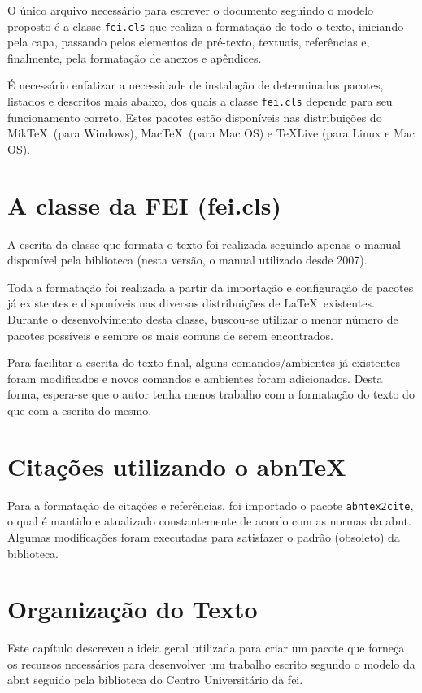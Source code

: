 \documentclass{fei}
\begin{document}
O único arquivo necessário para escrever o documento seguindo o modelo proposto é a classe \texttt{fei.cls} que realiza a formatação de todo o texto, iniciando pela capa, passando pelos elementos de pré-texto, textuais, referências e, finalmente, pela formatação de anexos e apêndices.

É necessário enfatizar a necessidade de instalação de determinados pacotes, listados e descritos mais abaixo, dos quais a classe \texttt{fei.cls} depende para seu funcionamento correto. Estes pacotes estão disponíveis nas distribuições do Mik\TeX~(para Windows), Mac\TeX~(para Mac OS) e \TeX Live (para Linux e Mac OS).

\section{A classe da FEI (fei.cls)}

A escrita da classe que formata o texto foi realizada seguindo apenas o manual disponível pela biblioteca (nesta versão, o manual utilizado desde 2007).

Toda a formatação foi realizada a partir da importação e configuração de pacotes já existentes e disponíveis nas diversas distribuições de \LaTeX~existentes. Durante o desenvolvimento desta classe, buscou-se utilizar o menor número de pacotes possíveis e sempre os mais comuns de serem encontrados.

Para facilitar a escrita do texto final, alguns comandos/ambientes já existentes foram modificados e novos comandos e ambientes foram adicionados. Desta forma, espera-se que o autor tenha menos trabalho com a formatação do texto do que com a escrita do mesmo.

\section{Citações utilizando o abn\TeX}

Para a formatação de citações e referências, foi importado o pacote \texttt{abntex2cite}, o qual é mantido e atualizado constantemente de acordo com as normas da \gls{abnt}. Algumas modificações foram executadas para satisfazer o padrão (obsoleto) da biblioteca.

\section{Organização do Texto}

Este capítulo descreveu a ideia geral utilizada para criar um pacote que forneça os recursos necessários para desenvolver um trabalho escrito segundo o modelo da \gls{abnt} seguido pela biblioteca do Centro Universitário da \gls{fei}.
\end{document}
